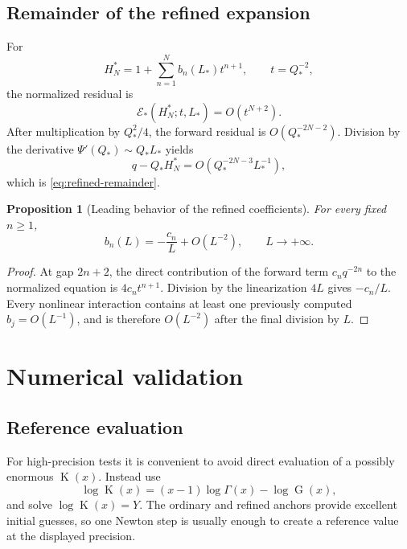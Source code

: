 \documentclass[11pt,oneside]{article}
\theoremstyle{plain}
\newtheorem{proposition}[theorem]{Proposition}
\theoremstyle{definition}
\theoremstyle{remark}
\newcommand{\Kfun}{\operatorname{K}}
\newcommand{\Gfun}{\operatorname{G}}
\newcommand{\calE}{\mathcal{E}}
\begin{document}
\subsection{Remainder of the refined expansion}

For
\begin{equation}
 H_N^*=1+\sum_{n=1}^{N}b_n(L_*)t^{n+1},
 \qquad t=Q_*^{-2},
 \label{eq:HN-refined}
\end{equation}
the normalized residual is
\begin{equation}
 \calE_*(H_N^*;t,L_*)=O(t^{N+2}).
 \label{eq:E-refined-order}
\end{equation}
After multiplication by \(Q_*^2/4\), the forward residual is
\(O(Q_*^{-2N-2})\).  Division by the derivative
\(\Psi'(Q_*)\sim Q_*L_*\) yields
\begin{equation}
 q-Q_*H_N^*=O(Q_*^{-2N-3}L_*^{-1}),
 \label{eq:refined-inverse-error-proof}
\end{equation}
which is \eqref{eq:refined-remainder}.

\begin{proposition}[Leading behavior of the refined coefficients]
\label{prop:bn-leading}
For every fixed \(n\ge1\),
\begin{equation}
 b_n(L)=-\frac{c_n}{L}+O(L^{-2}),
 \qquad L\to+\infty.
 \label{eq:bn-leading}
\end{equation}
\end{proposition}

\begin{proof}
At gap \(2n+2\), the direct contribution of the forward term
\(c_nq^{-2n}\) to the normalized equation is \(4c_nt^{n+1}\).  Division by
the linearization \(4L\) gives \(-c_n/L\).  Every nonlinear interaction
contains at least one previously computed \(b_j=O(L^{-1})\), and is therefore
\(O(L^{-2})\) after the final division by \(L\).
\end{proof}

\section{Numerical validation}
\label{sec:numerics}

\subsection{Reference evaluation}

For high-precision tests it is convenient to avoid direct evaluation of a
possibly enormous \(\Kfun(x)\).  Instead use
\begin{equation}
 \log\Kfun(x)=(x-1)\log\Gamma(x)-\log\Gfun(x),
 \label{eq:numeric-logK}
\end{equation}
and solve \(\log\Kfun(x)=Y\).  The ordinary and refined anchors provide
excellent initial guesses, so one Newton step is usually enough to create a
reference value at the displayed precision.
\end{document}
